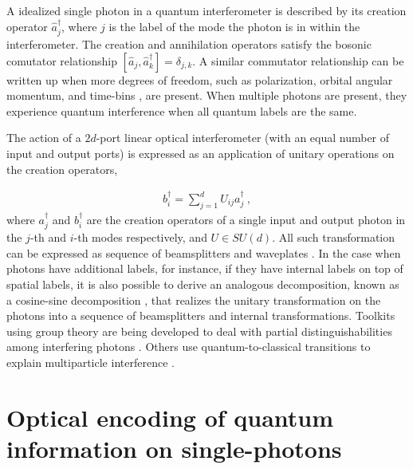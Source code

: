 \documentclass[aps,rmp,twocolumn,amsmath,amssymb,nofootinbib,superscriptaddress]{revtex4}
\newcommand{\sihui}[1]{{\color{Orchid}{#1}}}
\newcommand{\ah}{\hat{a}}
\newcommand{\adagh}{\hat{a}^\dag}
\begin{document}
A idealized single photon in a quantum interferometer is described by its creation operator $\adagh_{j}$, where $j$ is the label of the mode the photon is in  within the interferometer. The creation and annihilation operators satisfy the bosonic comutator relationship $[\ah_{j},\adagh_{k}]=\delta_{j,k}$. A similar commutator relationship can be  written up when more degrees of freedom, such as polarization, orbital angular momentum, and time-bins \cite{bib:Tillmann2015,bib:Bozinovic2013, bib:Nicolas2014, bib:Humphreys2013, bib:Donohue2013}, are present. When multiple photons are present, they experience quantum interference when all quantum labels are the same.

The action of a $2d$-port linear optical interferometer (with an equal number of input and output ports) is expressed as an application of unitary operations on the creation operators,

\begin{align}
b_i^{\dag}=\sum_{j=1}^d U_{ij}a_j^\dag \ ,
\end{align}
where $a_j^\dag$ and $b_i^\dag$ are the creation operators of a single input and output photon in the $j$-th and $i$-th modes respectively, and $U\in SU(d)$. All such transformation can be expressed as sequence of beamsplitters and waveplates \cite{bib:Reck1994}. In the case when photons have additional labels, for instance, if they have internal labels on top of spatial labels, it is also possible to derive an analogous decomposition, known as a cosine-sine decomposition \cite{bib:Dhand2015}, that realizes the unitary transformation on the photons into a sequence of beamsplitters and internal transformations. Toolkits using group theory are being developed to deal with partial distinguishabilities among interfering photons \cite{bib:Tan2013,bib:deGuise2014,bib:deGuise2015}. Others use
quantum-to-classical transitions to explain multiparticle interference \cite{bib:Ra2013}. \sihui{Experimental implementation [Walmsley, Jennewein]}



\section{Optical encoding of quantum information on single-photons}

\end{document}

